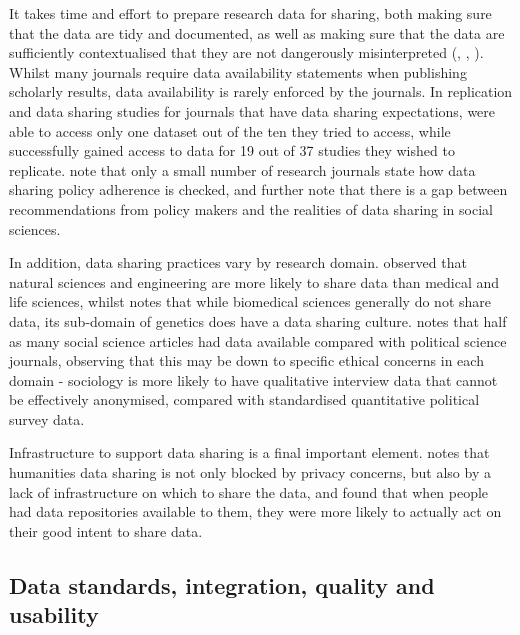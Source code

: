 \documentclass{CUP-JNL-DAP}%
\begin{document}
 It takes time and effort to prepare research data for sharing, both making sure that the data are tidy and documented, as well as making sure that the data are sufficiently contextualised that they are not dangerously misinterpreted (\cite{datasharing_rcts}, \cite{Yimei_Zhu_Open_access_in_uk}, \cite{empirical_datasharing_plos}). Whilst many journals require data availability statements when publishing scholarly results, data availability is rarely enforced by the journals. In replication and data sharing studies for journals that have data sharing expectations, \cite{empirical_datasharing_plos} were able to access only one dataset out of the ten they tried to access, while \cite{datasharing_rcts} successfully gained access to data for 19 out of 37 studies they wished to replicate. \cite{datasharing_sociology} note that only a small number of research journals state how data sharing policy adherence is checked, and further note that there is a gap between recommendations from policy makers and the realities of data sharing in social sciences. 
 
 In addition, data sharing practices vary by research domain. \cite{Yimei_Zhu_Open_access_in_uk} observed that natural sciences and engineering are more likely to share data than medical and life sciences, whilst \cite{datasharing_rcts} notes that while biomedical sciences generally do not share data, its sub-domain of genetics does have a data sharing culture. \cite{datasharing_sociology} notes that half as many social science articles had data available compared with political science journals, observing that this may be down to specific ethical concerns in each domain - sociology is more likely to have qualitative interview data that cannot be effectively anonymised, compared with standardised quantitative political survey data. 

Infrastructure to support data sharing is a final important element. \cite{Yimei_Zhu_Open_access_in_uk} notes that humanities data sharing is not only blocked by privacy concerns, but also by a lack of infrastructure on which to share the data, and \cite{Kim_Zhang_data_repos} found that when people had data repositories available to them, they were more likely to actually act on their good intent to share data.

\subsection{Data standards, integration, quality and usability}
\end{document}
